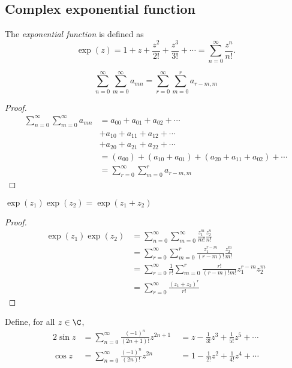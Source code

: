 \documentclass[a4paper]{article}
\begin{document}
\subsection{Complex exponential function}
\begin{defi}
  The \emph{exponential function} is defined as
  \[
  \exp (z) = 1 + z + \frac{z^2}{2!} + \frac{z^3}{3!} + \cdots = \sum_{n = 0}^\infty \frac{z^n}{n!}.
  \]
\end{defi}

\begin{lemma}
  \[
  \sum_{n = 0}^\infty\sum_{m = 0}^\infty a_{mn} = \sum_{r = 0}^\infty\sum_{m = 0}^r a_{r - m, m}
  \]
\end{lemma}

\begin{proof}
  \begin{align*}
    \sum_{n = 0}^\infty\sum_{m = 0}^\infty a_{mn} &= a_{00} + a_{01} + a_{02} + \cdots\\
    &+ a_{10} + a_{11} + a_{12} + \cdots\\
    &+ a_{20} + a_{21} + a_{22} + \cdots\\
    &= (a_{00}) + (a_{10} + a_{01}) + (a_{20} + a_{11} + a_{02}) + \cdots\\
    &= \sum_{r = 0}^\infty\sum_{m = 0}^r a_{r - m, m}
  \end{align*}
\end{proof}
\begin{thm}
  $\exp(z_1)\exp(z_2) = \exp(z_1 + z_2)$
\end{thm}

\begin{proof}
  \begin{align*}
    \exp(z_1)\exp(z_2) &= \sum_{n = 0}^\infty\sum_{m = 0}^\infty \frac{z_1^m}{m!}\frac{z_2^n}{n!}\\
    &= \sum_{r = 0}^\infty\sum_{m = 0}^r \frac{z_1^{r - m}}{(r - m)!}\frac{z_2^m}{m!}\\
    &= \sum_{r = 0}^\infty\frac{1}{r!}\sum_{m = 0}^r \frac{r!}{(r - m)!m!}z_1^{r - m}z_2^m\\
    &= \sum_{r = 0}^\infty\frac{(z_1 + z_2)^r}{r!}
  \end{align*}
\end{proof}

\begin{defi}
  Define, for all $z\in \C$,
  \begin{alignat*}{2}
    \sin z &= \sum_{n=0}^\infty \frac{(-1)^n}{(2n+1)!}z^{2n+1} &\;= z - \frac{1}{3!}z^3 + \frac{1}{5!}z^5 + \cdots\\
    \cos z &= \sum_{n=0}^\infty \frac{(-1)^n}{(2n)!}z^{2n} &\;= 1 - \frac{1}{2!}z^2 + \frac{1}{4!}z^4 + \cdots
  \end{alignat*}
\end{defi}
\end{document}

